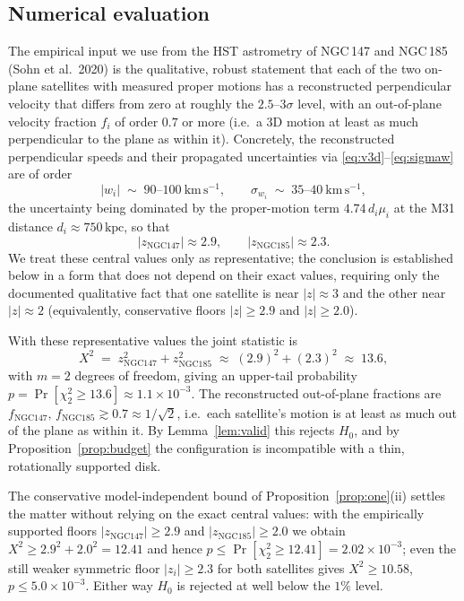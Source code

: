 \documentclass{amsart}
\theoremstyle{definition}
\begin{document}
\subsection{Numerical evaluation}\label{sec:num}
The empirical input we use from the HST astrometry of NGC\,147 and NGC\,185
(Sohn et al.\ 2020) is the qualitative, robust statement that each of the
two on-plane satellites with measured proper motions has a reconstructed
perpendicular velocity that differs from zero at roughly the $2.5$--$3\sigma$
level, with an out-of-plane velocity fraction $f_i$ of order $0.7$ or more
(i.e.\ a 3D motion at least as much perpendicular to the plane as within it).
Concretely, the reconstructed perpendicular speeds and their propagated
uncertainties via \eqref{eq:v3d}--\eqref{eq:sigmaw} are of order
\[
  |w_i| \;\sim\; 90\text{--}100\ \mathrm{km\,s^{-1}},
  \qquad
  \sigma_{w_i}\;\sim\;35\text{--}40\ \mathrm{km\,s^{-1}},
\]
the uncertainty being dominated by the proper-motion term
$4.74\,d_i\mu_i$ at the M31 distance $d_i\approx 750\,\mathrm{kpc}$, so that
\[
  |z_{\mathrm{NGC147}}|\approx 2.9,
  \qquad
  |z_{\mathrm{NGC185}}|\approx 2.3 .
\]
We treat these central values only as representative; the conclusion is
established below in a form that does not depend on their exact values,
requiring only the documented qualitative fact that one satellite is near
$|z|\approx 3$ and the other near $|z|\approx 2$ (equivalently, conservative
floors $|z|\ge 2.9$ and $|z|\ge 2.0$).

With these representative values the joint statistic is
\[
  X^2 \;=\; z_{\mathrm{NGC147}}^2 + z_{\mathrm{NGC185}}^2
        \;\approx\; (2.9)^2 + (2.3)^2 \;\approx\; 13.6,
\]
with $m=2$ degrees of freedom, giving an upper-tail probability
$p=\Pr[\chi^2_2\ge 13.6]\approx 1.1\times10^{-3}$. The reconstructed
out-of-plane fractions are $f_{\mathrm{NGC147}},\,f_{\mathrm{NGC185}}
\gtrsim 0.7\approx1/\sqrt2$, i.e.\ each satellite's motion is at least as
much out of the plane as within it. By Lemma~\ref{lem:valid} this rejects
$H_0$, and by Proposition~\ref{prop:budget} the configuration is
incompatible with a thin, rotationally supported disk.

The conservative model-independent bound of Proposition~\ref{prop:one}(ii)
settles the matter without relying on the exact central values: with the
empirically supported floors $|z_{\mathrm{NGC147}}|\ge 2.9$ and
$|z_{\mathrm{NGC185}}|\ge 2.0$ we obtain $X^2\ge 2.9^2+2.0^2=12.41$ and hence
$p\le\Pr[\chi^2_2\ge 12.41]=2.02\times10^{-3}$; even the still weaker
symmetric floor $|z_i|\ge 2.3$ for both satellites gives $X^2\ge 10.58$,
$p\le 5.0\times10^{-3}$. Either way $H_0$ is rejected at well below the
$1\%$ level.
\end{document}
